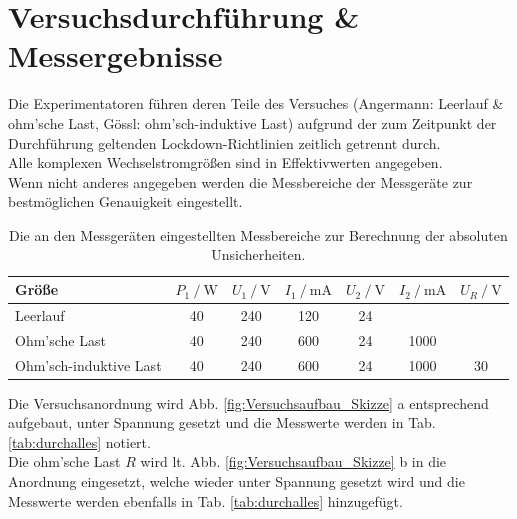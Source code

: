 \documentclass[12pt,a4paper,twoside]{article}
\theoremstyle{definition}
\begin{document}
\section{Versuchsdurchführung \& Messergebnisse}

Die Experimentatoren führen deren Teile des Versuches (Angermann: Leerlauf \& ohm'sche Last, Gössl: ohm'sch-induktive Last) aufgrund der zum Zeitpunkt der Durchführung geltenden Lockdown-Richtlinien zeitlich getrennt durch. \\
Alle komplexen Wechselstromgrößen sind in Effektivwerten angegeben. \\
Wenn nicht anderes angegeben werden die Messbereiche der Messgeräte zur bestmöglichen Genauigkeit eingestellt.
\begin{table}[H]
    \centering
    \caption{Die an den Messgeräten eingestellten Messbereiche zur Berechnung der absoluten Unsicherheiten.}
    \label{tab:skala}
    \begin{tabular}{| l | *{6}{S|}}
        \hline
        Größe                   & {$P_1 \ / \ \si{\watt}$}  & {$U_1 \ / \ \si{\volt}$}  & {$I_1 \ / \ \si{\milli\ampere}$}  & {$U_2 \ / \ \si{\volt}$}  & {$I_2 \ / \ \si{\milli\ampere}$}    & {$U_R \ / \ \si{\volt}$} \\
        \hline
        Leerlauf                & 40                        & 240                       & 120                               & 24                        &                                         & \\
        Ohm'sche Last           & 40                        & 240                       & 600                               & 24                        & 1000                                     & \\
        Ohm'sch-induktive Last  & 40                        & 240                       & 600                               & 24                        & 1000                                     & 30 \\
        \hline
    \end{tabular}
\end{table}

Die Versuchsanordnung wird Abb. \ref{fig:Versuchsaufbau_Skizze} a entsprechend aufgebaut, unter Spannung gesetzt und die Messwerte werden in Tab. \ref{tab:durchalles} notiert. \\

Die ohm'sche Last $R$ wird lt. Abb. \ref{fig:Versuchsaufbau_Skizze} b in die Anordnung eingesetzt, welche wieder unter Spannung gesetzt wird und die Messwerte werden ebenfalls in Tab. \ref{tab:durchalles} hinzugefügt. \\
\end{document}
